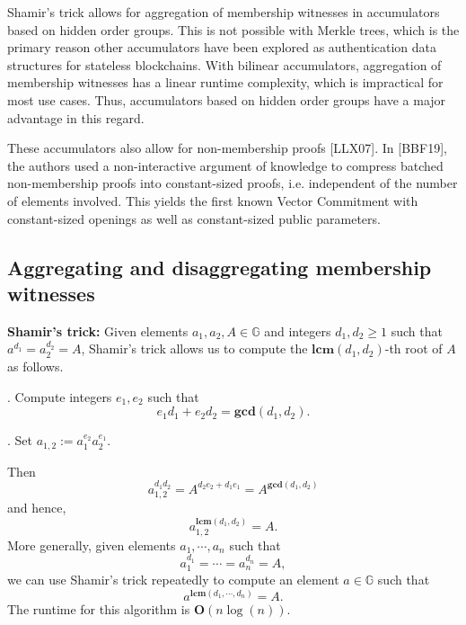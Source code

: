 \documentclass[11pt, lettersize, notitlepage, leqno, footskip=0.6cm]{article}
\newcommand{\bz}{\mathbb Z}
\newcommand{\pl}{\prod\limits}
\newcommand{\slim}{\sum\limits}
\newcommand{\mb}{\mathbb}
\newcommand{\mbf}{\mathbf}
\newcommand{\vs}{\vspace{-0.15cm}}
\newcommand{\op}{overwhelming probability}
\newcommand{\LCM}{\mbf{lcm}}
\newcommand{\GCD}{\mbf{gcd}}
\numberwithin{equation}{section}
\begin{document}
Shamir's trick allows for aggregation of membership witnesses in accumulators based on hidden order groups. This is not possible with Merkle trees, which is the primary reason other accumulators have been explored as authentication data structures for stateless blockchains. With bilinear accumulators, aggregation of membership witnesses has a linear runtime complexity, which is impractical for most use cases. Thus, accumulators based on hidden order groups have a major advantage in this regard.

These accumulators also allow for non-membership proofs [LLX07]. In [BBF19], the authors used a non-interactive argument of knowledge to compress batched non-membership proofs into constant-sized proofs, i.e. independent of the number of elements involved. This yields the first known Vector Commitment with constant-sized openings as well as  constant-sized public parameters.


\subsection{\fontsize{11}{11} Aggregating and disaggregating membership witnesses}

\noindent \textbf{Shamir's trick:} Given elements $a_1, a_2, A\in \mb{G}$ and integers $d_1, d_2\geq 1$ such that $a^{d_1} = a_2^{d_2} = A$, Shamir's trick allows us to compute the $\LCM(d_1, d_2)$-th root of $A$ as follows.

. Compute integers $e_1, e_2$ such that \vs $$e_1d_1+e_2d_2 = \GCD(d_1, d_2).$$

. Set $a_{1,2}:= a_1^{e_2}a_2^{e_1} $. 

\noindent Then \vspace{-0.15cm}$$a_{1,2}^{d_1d_2} = A^{d_2e_2 + d_1e_1} = A^{\GCD(d_1,d_2)}$$ and hence, \vspace{-0.15cm}$$a_{1,2}^{\LCM(d_1,d_2)} = A.$$ More generally, given elements $a_1,\cdots,a_n$ such that \vs $$a_1^{d_1} = \cdots = a_n^{d_n} = A, $$ we can use Shamir's trick repeatedly to compute an element $a\in\mb{G}$ such that \vs $$a^{\LCM(d_1,\cdots,d_n)} = A.$$ The runtime for this algorithm is $\mbf{O}(n\log(n))$. 

\begin{comment} Conversely, for any element $b = \pl_{i=1}^n a_i^{x_i}$ $(x_i\in\bz)$, we have \vs $$ b^{\LCM(d_1,\cdots,d_n)} = A^{\slim_{i=1}^n  \frac{\LCM(d_1,\cdots,d_n)x_i}{d_i}} $$ and the low order assumption implies that with \op, \vs $$b =  a^{\slim_{i=1}^n  \frac{\LCM(d_1,\cdots,d_n)x_i}{d_i}}.$$ Thus, $b$ is expressible as a power of $a$. 

\end{comment}
\end{document}
